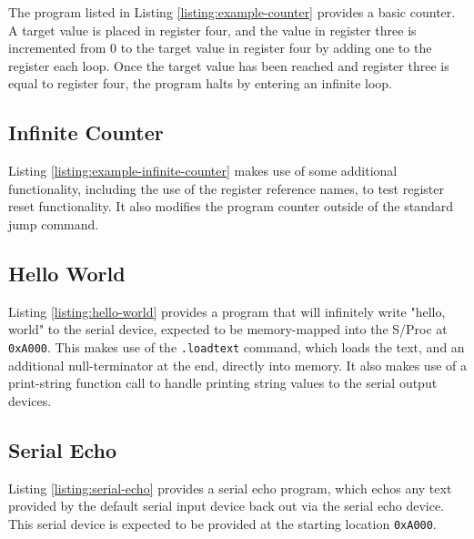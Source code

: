 \documentclass{article}
\begin{document}
The program listed in Listing \ref{listing:example-counter} provides a basic counter. A target value is placed in register four, and the value in register three is incremented from 0 to the target value in register four by adding one to the register each loop. Once the target value has been reached and register three is equal to register four, the program halts by entering an infinite loop.



\subsection{Infinite Counter}

Listing \ref{listing:example-infinite-counter} makes use of some additional functionality, including the use of the register reference names, to test register reset functionality. It also modifies the program counter outside of the standard jump command.



\subsection{Hello World}

Listing  \ref{listing:hello-world} provides a program that will infinitely write "hello, world" to the serial device, expected to be memory-mapped into the S/Proc at \texttt{0xA000}. This makes use of the \texttt{.loadtext} command, which loads the text, and an additional null-terminator at the end, directly into memory. It also makes use of a print-string function call to handle printing string values to the serial output devices.



\pagebreak

\subsection{Serial Echo}

Listing \ref{listing:serial-echo} provides a serial echo program, which echos any text provided by the default serial input device back out via the serial echo device. This serial device is expected to be provided at the starting location \texttt{0xA000}.
\end{document}
